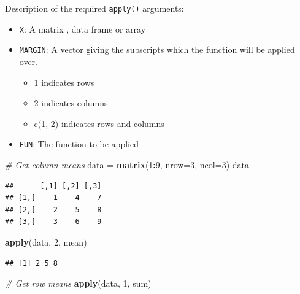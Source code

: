 \documentclass[
]{book}
\newenvironment{Shaded}{\begin{snugshade}}{\end{snugshade}}
\newcommand{\CommentTok}[1]{\textcolor[rgb]{0.56,0.35,0.01}{\textit{#1}}}
\newcommand{\DataTypeTok}[1]{\textcolor[rgb]{0.13,0.29,0.53}{#1}}
\newcommand{\DecValTok}[1]{\textcolor[rgb]{0.00,0.00,0.81}{#1}}
\newcommand{\KeywordTok}[1]{\textcolor[rgb]{0.13,0.29,0.53}{\textbf{#1}}}
\newcommand{\NormalTok}[1]{#1}
\newcommand{\OperatorTok}[1]{\textcolor[rgb]{0.81,0.36,0.00}{\textbf{#1}}}
\newcommand{\StringTok}[1]{\textcolor[rgb]{0.31,0.60,0.02}{#1}}
\providecommand{\tightlist}{%
  \setlength{\itemsep}{0pt}\setlength{\parskip}{0pt}}
\begin{document}
Description of the required \texttt{apply()} arguments:

\begin{itemize}
\tightlist
\item
  \texttt{X}: A matrix , data frame or array
\item
  \texttt{MARGIN}: A vector giving the subscripts which the function will be applied over.

  \begin{itemize}
  \tightlist
  \item
    1 indicates rows
  \item
    2 indicates columns
  \item
    c(1, 2) indicates rows and columns
  \end{itemize}
\item
  \texttt{FUN}: The function to be applied
\end{itemize}

\begin{Shaded}
\begin{Highlighting}[]
\CommentTok{# Get column means }
\NormalTok{data =}\StringTok{ }\KeywordTok{matrix}\NormalTok{(}\DecValTok{1}\OperatorTok{:}\DecValTok{9}\NormalTok{, }\DataTypeTok{nrow=}\DecValTok{3}\NormalTok{, }\DataTypeTok{ncol=}\DecValTok{3}\NormalTok{)}
\NormalTok{data}
\end{Highlighting}
\end{Shaded}

\begin{verbatim}
##      [,1] [,2] [,3]
## [1,]    1    4    7
## [2,]    2    5    8
## [3,]    3    6    9
\end{verbatim}

\begin{Shaded}
\begin{Highlighting}[]
\KeywordTok{apply}\NormalTok{(data, }\DecValTok{2}\NormalTok{, mean)}
\end{Highlighting}
\end{Shaded}

\begin{verbatim}
## [1] 2 5 8
\end{verbatim}

\begin{Shaded}
\begin{Highlighting}[]
\CommentTok{# Get row means }
\KeywordTok{apply}\NormalTok{(data, }\DecValTok{1}\NormalTok{, sum)}
\end{Highlighting}
\end{Shaded}
\end{document}
